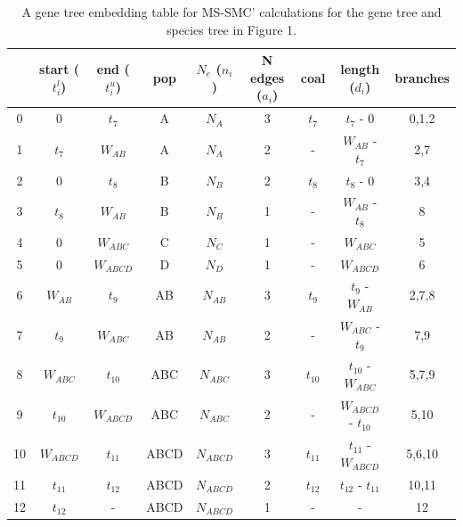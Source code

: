 \documentclass[11pt]{article}
\begin{document}
\begin{table}[h]
\centering
\caption{\label{tab:table-1} 
	A gene tree embedding table for MS-SMC' calculations for the gene tree and
 	species tree in Figure 1. 
}
\begin{tabular}[t]{ |c|c|c|c|c|c|c|c|c| }
	\toprule
	 & start ($t_i^l$)  & end ($t_i^u$) & pop & $N_e$ ($n_i$)  & N edges ($a_i$) & coal  & length ($d_i$) & branches \\
	\midrule
	0 & 0          & $t_7$      & A   & $N_A$     & 3 & $t_7$    & $t_7$ - 0            & 0,1,2 \\
	1 & $t_7$      & $W_{AB}$   & A   & $N_A$     & 2 & -        & $W_{AB}$ - $t_7$     & 2,7   \\	
	2 & 0          & $t_8$      & B   & $N_B$     & 2 & $t_8$    & $t_8$ - 0            & 3,4   \\ 
	3 & $t_8$      & $W_{AB}$   & B   & $N_B$     & 1 & -        & $W_{AB}$ - $t_8$     & 8     \\
	4 & 0          & $W_{ABC}$  & C   & $N_C$     & 1 & -        & $W_{ABC}$            & 5     \\
	5 & 0          & $W_{ABCD}$ & D   & $N_D$     & 1 & -        & $W_{ABCD}$           & 6     \\
	6 & $W_{AB}$   & $t_9$      & AB  & $N_{AB}$  & 3 & $t_9$    & $t_9$ - $W_{AB}$     & 2,7,8 \\
	7 & $t_9$      & $W_{ABC}$  & AB  & $N_{AB}$  & 2 & -        & $W_{ABC}$ - $t_9$    & 7,9   \\
	8 & $W_{ABC}$  & $t_{10}$   & ABC & $N_{ABC}$ & 3 & $t_{10}$ & $t_{10}$ - $W_{ABC}$ & 5,7,9  \\
	9 & $t_{10}$   & $W_{ABCD}$ & ABC & $N_{ABC}$ & 2 & -        & $W_{ABCD}$ - $t_{10}$ & 5,10 \\
	10 & $W_{ABCD}$ & $t_{11}$  & ABCD & $N_{ABCD}$ & 3 & $t_{11}$ & $t_{11}$ - $W_{ABCD}$ & 5,6,10 \\
	11 & $t_{11}$  & $t_{12}$   & ABCD & $N_{ABCD}$ & 2 & $t_{12}$ & $t_{12}$ - $t_{11}$ & 10,11 \\
	12 & $t_{12}$  & -          & ABCD & $N_{ABCD}$ & 1 & -        & -                   & 12    \\	
	\bottomrule
\end{tabular}
\end{table}
\end{document}
